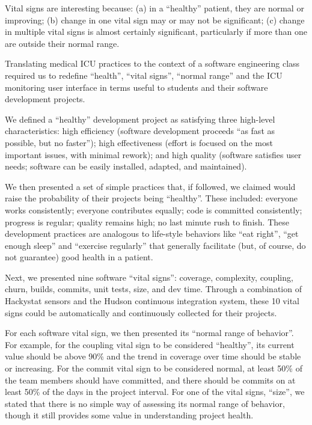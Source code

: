 \documentclass{acm_proc_article-sp}
\begin{document}
Vital signs are interesting because: (a) in a ``healthy'' patient, they are
normal or improving; (b) change in one vital sign may or may not be
significant; (c) change in multiple vital signs is almost certainly
significant, particularly if more than one are outside their normal range.

Translating medical ICU practices to the context of a software engineering
class required us to redefine ``health'', ``vital signs'', ``normal range''
and the ICU monitoring user interface in terms useful to students and their
software development projects.

We defined a ``healthy'' development project as satisfying three high-level
characteristics: high efficiency (software development proceeds ``as fast
as possible, but no faster''); high effectiveness (effort is focused on the
most important issues, with minimal rework); and high quality (software
satisfies user needs; software can be easily installed, adapted, and
maintained).

We then presented a set of simple practices that, if followed, we claimed
would raise the probability of their projects being ``healthy''.  These
included: everyone works consistently; everyone contributes equally; code
is committed consistently; progress is regular; quality remains high; no
last minute rush to finish.  These development practices are analogous to
life-style behaviors like ``eat right'', ``get enough sleep'' and
``exercise regularly'' that generally facilitate (but, of course, do not
guarantee) good health in a patient.

Next, we presented nine software ``vital signs'': coverage, complexity,
coupling, churn, builds, commits, unit tests, size, and dev
time. Through a combination of Hackystat sensors and the Hudson continuous
integration system, these 10 vital signs could be automatically and
continuously collected for their projects.

For each software vital sign, we then presented its ``normal range of
behavior''.  For example, for the coupling vital sign to be considered
``healthy'', its current value should be above 90\% and the trend in
coverage over time should be stable or increasing.  For the commit vital
sign to be considered normal, at least 50\% of the team members should have
committed, and there should be commits on at least 50\% of the days in the
project interval.  For one of the vital signs, ``size'', we stated that
there is no simple way of assessing its normal range of behavior, though
it still provides some value in understanding project health.
\end{document}
